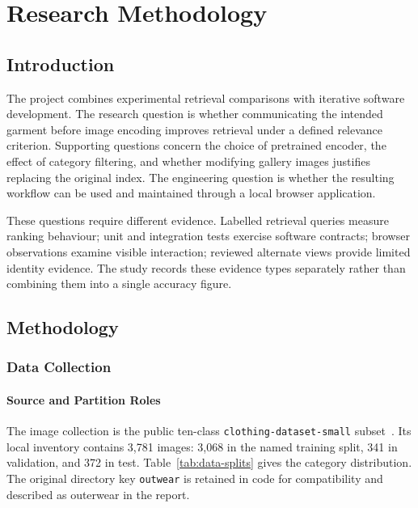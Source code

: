 \chapter{Research Methodology}
\label{ch:methodology}

\section{Introduction}
The project combines experimental retrieval comparisons with iterative software
development. The research question is whether communicating the intended garment
before image encoding improves retrieval under a defined relevance criterion.
Supporting questions concern the choice of pretrained encoder, the effect of
category filtering, and whether modifying gallery images justifies replacing the
original index. The engineering question is whether the resulting workflow can
be used and maintained through a local browser application.

These questions require different evidence. Labelled retrieval queries measure
ranking behaviour; unit and integration tests exercise software contracts;
browser observations examine visible interaction; reviewed alternate views
provide limited identity evidence. The study records these evidence types
separately rather than combining them into a single accuracy figure.

\section{Methodology}
\subsection{Data Collection}
\subsubsection{Source and Partition Roles}
The image collection is the public ten-class \texttt{clothing-dataset-small}
subset~\cite{GrigorevClothingDataset}. Its local inventory contains 3,781 images:
3,068 in the named training split, 341 in validation, and 372 in test.
Table~\ref{tab:data-splits} gives the category distribution. The original directory
key \texttt{outwear} is retained in code for compatibility and described as
outerwear in the report.

\begin{table}[H]
\centering\caption{Verified image inventory by category and partition}
\label{tab:data-splits}
\begin{ReportTable}\end{ReportTable}
\end{table}

